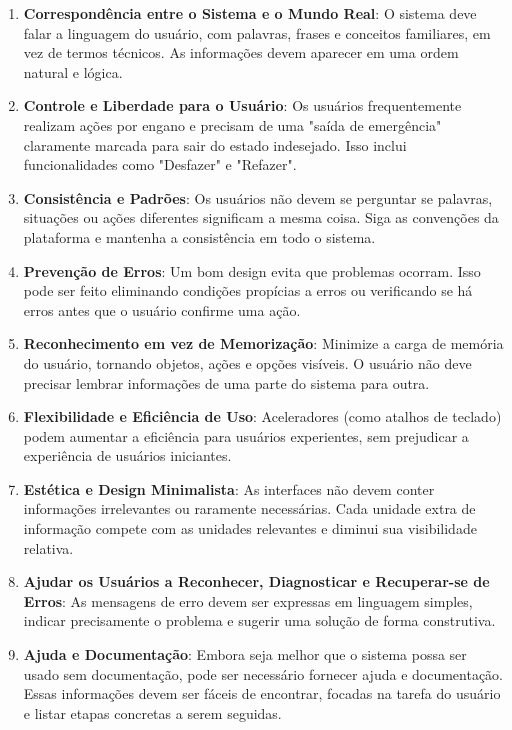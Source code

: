 {\begin{enumerate}
    \item \textbf{Correspondência entre o Sistema e o Mundo Real}: O sistema deve falar a linguagem do usuário, com palavras, frases e conceitos familiares, em vez de termos técnicos. As informações devem aparecer em uma ordem natural e lógica.

    \item \textbf{Controle e Liberdade para o Usuário}: Os usuários frequentemente realizam ações por engano e precisam de uma "saída de emergência" claramente marcada para sair do estado indesejado. Isso inclui funcionalidades como "Desfazer" e "Refazer".

    \item \textbf{Consistência e Padrões}: Os usuários não devem se perguntar se palavras, situações ou ações diferentes significam a mesma coisa. Siga as convenções da plataforma e mantenha a consistência em todo o sistema.

    \item \textbf{Prevenção de Erros}: Um bom design evita que problemas ocorram. Isso pode ser feito eliminando condições propícias a erros ou verificando se há erros antes que o usuário confirme uma ação.

    \item \textbf{Reconhecimento em vez de Memorização}: Minimize a carga de memória do usuário, tornando objetos, ações e opções visíveis. O usuário não deve precisar lembrar informações de uma parte do sistema para outra.

    \item \textbf{Flexibilidade e Eficiência de Uso}: Aceleradores (como atalhos de teclado) podem aumentar a eficiência para usuários experientes, sem prejudicar a experiência de usuários iniciantes.

    \item \textbf{Estética e Design Minimalista}: As interfaces não devem conter informações irrelevantes ou raramente necessárias. Cada unidade extra de informação compete com as unidades relevantes e diminui sua visibilidade relativa.

    \item \textbf{Ajudar os Usuários a Reconhecer, Diagnosticar e Recuperar-se de Erros}: As mensagens de erro devem ser expressas em linguagem simples, indicar precisamente o problema e sugerir uma solução de forma construtiva.

    \item \textbf{Ajuda e Documentação}: Embora seja melhor que o sistema possa ser usado sem documentação, pode ser necessário fornecer ajuda e documentação. Essas informações devem ser fáceis de encontrar, focadas na tarefa do usuário e listar etapas concretas a serem seguidas.
\end{enumerate}

}
